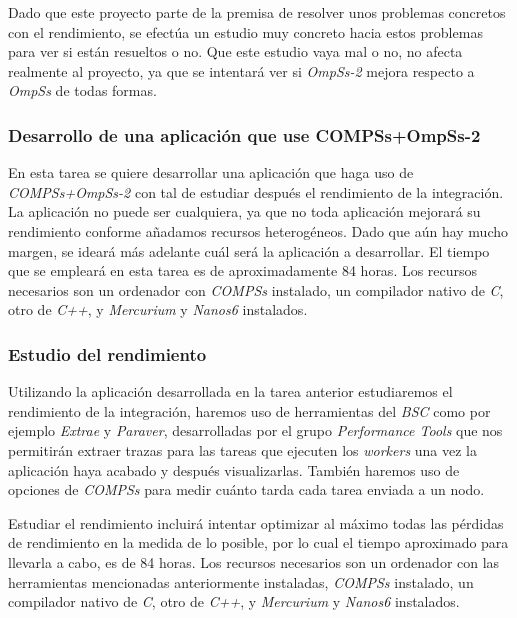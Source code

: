 Dado que este proyecto parte de la premisa de resolver unos problemas concretos con el rendimiento, se efectúa un estudio muy concreto hacia estos problemas para ver si están resueltos o no. Que este estudio vaya mal o no, no afecta realmente al proyecto, ya que se intentará ver si \textit{OmpSs-2} mejora respecto a \textit{OmpSs} de todas formas.

\subsubsection{Desarrollo de una aplicación que use COMPSs+OmpSs-2}

En esta tarea se quiere desarrollar una aplicación que haga uso de \textit{COMPSs+OmpSs-2} con tal de estudiar después el rendimiento de la integración. La aplicación no puede ser cualquiera, ya que no toda aplicación mejorará su rendimiento conforme añadamos recursos heterogéneos. Dado que aún hay mucho margen, se ideará más adelante cuál será la aplicación a desarrollar. El tiempo que se empleará en esta tarea es de aproximadamente 84 horas. Los recursos necesarios son un ordenador con \textit{COMPSs} instalado, un compilador nativo de \textit{C}, otro de \textit{C++}, y \textit{Mercurium} y \textit{Nanos6} instalados.

\subsubsection{Estudio del rendimiento}

Utilizando la aplicación desarrollada en la tarea anterior estudiaremos el rendimiento de la integración, haremos uso de herramientas del \textit{BSC} como por ejemplo \textit{Extrae} y \textit{Paraver}, desarrolladas por el grupo \textit{Performance Tools} que nos permitirán extraer trazas para las tareas que ejecuten los \textit{workers} una vez la aplicación haya acabado y después visualizarlas. También haremos uso de opciones de \textit{COMPSs} para medir cuánto tarda cada tarea enviada a un nodo.
\par\bigskip

Estudiar el rendimiento incluirá intentar optimizar al máximo todas las pérdidas de rendimiento en la medida de lo posible, por lo cual el tiempo aproximado para llevarla a cabo, es de 84 horas. Los recursos necesarios son un ordenador con las herramientas mencionadas anteriormente instaladas, \textit{COMPSs} instalado, un compilador nativo de \textit{C}, otro de \textit{C++}, y \textit{Mercurium} y \textit{Nanos6} instalados.

